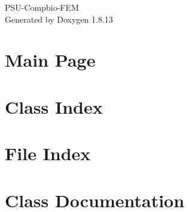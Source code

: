 \documentclass[twoside]{book}
\newcommand{\+}{\discretionary{\mbox{\scriptsize$\hookleftarrow$}}{}{}}
\newcommand{\clearemptydoublepage}{%
  \newpage{\pagestyle{empty}\cleardoublepage}%
}
\begin{document}
\hypersetup{pageanchor=false,
             bookmarksnumbered=true,
             pdfencoding=unicode
            }
\begin{titlepage}
\vspace*{7cm}
\begin{center}%
{\Large P\+S\+U-\/\+Compbio-\/\+F\+EM }\\
\vspace*{1cm}
{\large Generated by Doxygen 1.8.13}\\
\end{center}
\end{titlepage}
\clearemptydoublepage
{}
\tableofcontents
\clearemptydoublepage
{}
\hypersetup{pageanchor=true}

\chapter{Main Page}
\label{index}\hypertarget{index}{}
\chapter{Class Index}

\chapter{File Index}

\chapter{Class Documentation}


\end{document}
